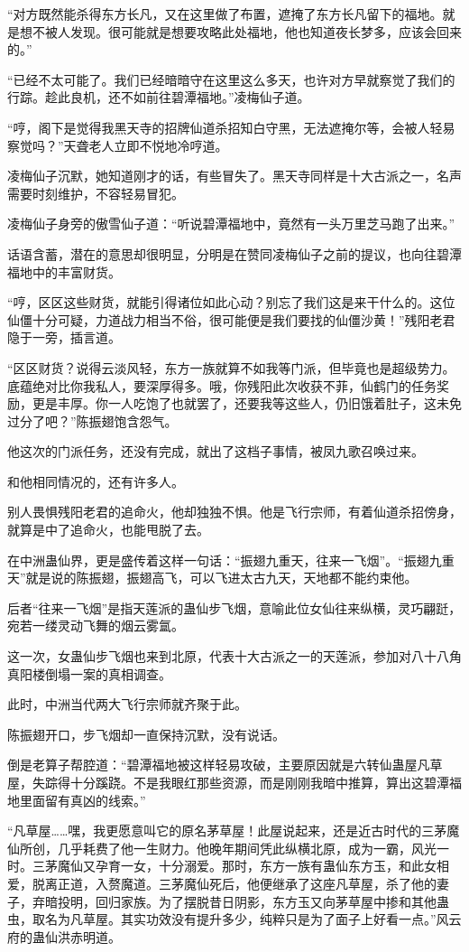 \begin{this_body}
“对方既然能杀得东方长凡，又在这里做了布置，遮掩了东方长凡留下的福地。就是想不被人发现。很可能就是想要攻略此处福地，他也知道夜长梦多，应该会回来的。”

“已经不太可能了。我们已经暗暗守在这里这么多天，也许对方早就察觉了我们的行踪。趁此良机，还不如前往碧潭福地。”凌梅仙子道。

“哼，阁下是觉得我黑天寺的招牌仙道杀招知白守黑，无法遮掩尔等，会被人轻易察觉吗？”天聋老人立即不悦地冷哼道。

凌梅仙子沉默，她知道刚才的话，有些冒失了。黑天寺同样是十大古派之一，名声需要时刻维护，不容轻易冒犯。

凌梅仙子身旁的傲雪仙子道：“听说碧潭福地中，竟然有一头万里芝马跑了出来。”

话语含蓄，潜在的意思却很明显，分明是在赞同凌梅仙子之前的提议，也向往碧潭福地中的丰富财货。

“哼，区区这些财货，就能引得诸位如此心动？别忘了我们这是来干什么的。这位仙僵十分可疑，力道战力相当不俗，很可能便是我们要找的仙僵沙黄！”残阳老君隐于一旁，插言道。

“区区财货？说得云淡风轻，东方一族就算不如我等门派，但毕竟也是超级势力。底蕴绝对比你我私人，要深厚得多。哦，你残阳此次收获不菲，仙鹤门的任务奖励，更是丰厚。你一人吃饱了也就罢了，还要我等这些人，仍旧饿着肚子，这未免过分了吧？”陈振翅饱含怨气。

他这次的门派任务，还没有完成，就出了这档子事情，被凤九歌召唤过来。

和他相同情况的，还有许多人。

别人畏惧残阳老君的追命火，他却独独不惧。他是飞行宗师，有着仙道杀招傍身，就算是中了追命火，也能甩脱了去。

在中洲蛊仙界，更是盛传着这样一句话：“振翅九重天，往来一飞烟”。“振翅九重天”就是说的陈振翅，振翅高飞，可以飞进太古九天，天地都不能约束他。

后者“往来一飞烟”是指天莲派的蛊仙步飞烟，意喻此位女仙往来纵横，灵巧翩跹，宛若一缕灵动飞舞的烟云雾氲。

这一次，女蛊仙步飞烟也来到北原，代表十大古派之一的天莲派，参加对八十八角真阳楼倒塌一案的真相调查。

此时，中洲当代两大飞行宗师就齐聚于此。

陈振翅开口，步飞烟却一直保持沉默，没有说话。

倒是老算子帮腔道：“碧潭福地被这样轻易攻破，主要原因就是六转仙蛊屋凡草屋，失踪得十分蹊跷。不是我眼红那些资源，而是刚刚我暗中推算，算出这碧潭福地里面留有真凶的线索。”

“凡草屋……嘿，我更愿意叫它的原名茅草屋！此屋说起来，还是近古时代的三茅魔仙所创，几乎耗费了他一生财力。他晚年期间凭此纵横北原，成为一霸，风光一时。三茅魔仙又孕育一女，十分溺爱。那时，东方一族有蛊仙东方玉，和此女相爱，脱离正道，入赘魔道。三茅魔仙死后，他便继承了这座凡草屋，杀了他的妻子，弃暗投明，回归家族。为了摆脱昔日阴影，东方玉又向茅草屋中掺和其他蛊虫，取名为凡草屋。其实功效没有提升多少，纯粹只是为了面子上好看一点。”风云府的蛊仙洪赤明道。


\end{this_body}
